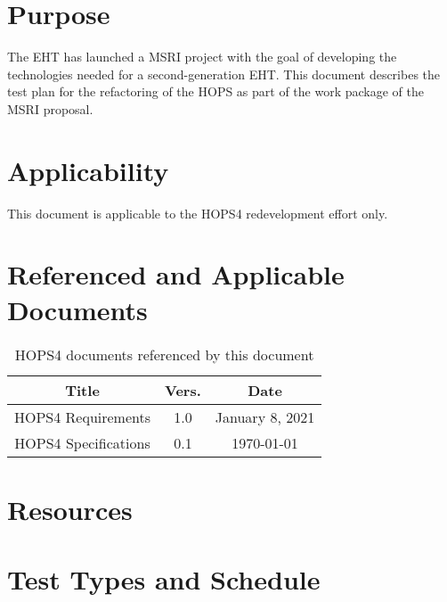 \documentclass[notitlepage,letterpaper,pdftex,12pt,final]{article}
\numberwithin{equation}{section}
\newcommand{\recdate}{\today}
\begin{document}
\section{Purpose}
\label{sec:purpose}
The \acs{EHT} has launched a \acs{MSRI} project with the goal of developing
the technologies needed for a second-generation \acs{EHT}. 
This document describes the test plan for the refactoring of the \ac{HOPS}
as part of the work package of the \acs{MSRI} proposal. 

\section{Applicability}
\label{sec:applicability}
This document is applicable to the HOPS4 redevelopment effort only.

\section{Referenced and Applicable Documents}
\label{sec:referenced-docs}
\begin{table}[h!]
\centering
 \begin{tabular}{c | c | c } 
 Title & Vers. & Date \\ [0.5ex]
 \hline%
 HOPS4 Requirements & 1.0 & January 8, 2021 \\ [1ex]
 HOPS4 Specifications & 0.1 & \recdate \\
 \end{tabular}
 \caption{HOPS4 documents referenced by this document}
 \label{table:1}
\end{table}

\section{Resources}
\label{sec:resources}


\section{Test Types and Schedule}
\label{sec:schedule}
\end{document}

